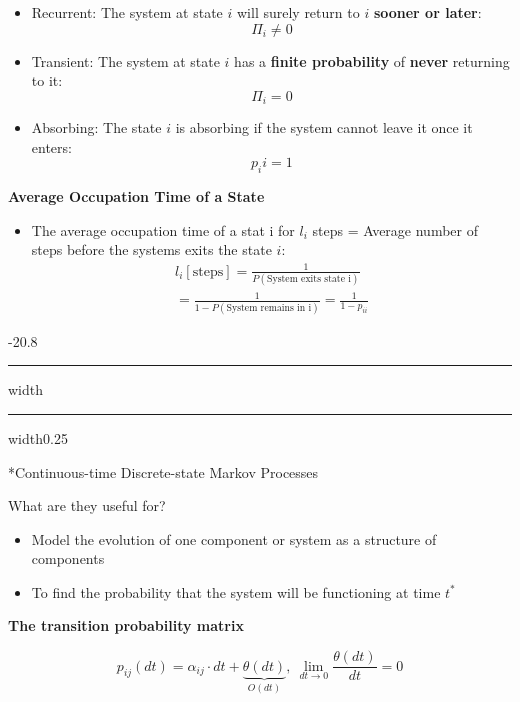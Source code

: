 \documentclass[8pt, landscape, fleqn]{scrartcl}
\makeatletter
\renewcommand{\subsection}{\@startsection{subsection}{1}{0mm}%
{-2\baselineskip}{0.8\baselineskip}%
{\hrule depth 0.2pt width\columnwidth\hrule depth0.75pt
width0.25\columnwidth\vspace*{1.2em}\large\bfseries\rmfamily}}
\makeatother
\begin{document}
\begin{multicols*}{3}
\begin{itemize}
    \item Recurrent: The system at state $i$ will surely return to $i$ \textbf{sooner or later}:
    \begin{equation}
        \Pi_i \neq 0
    \end{equation}
    \item Transient: The system at state $i$ has a \textbf{finite probability} of \textbf{never} returning to it:
    \begin{equation}
        \Pi_i = 0
    \end{equation}
    \item Absorbing: The state $i$ is absorbing if the system cannot leave it once it enters:
    \begin{equation}
        p_ii = 1
    \end{equation}
\end{itemize}

\newpage

\textbf{Average Occupation Time of a State}

\begin{itemize}
    \item The average occupation time of a stat i for $l_i$ steps = Average number of steps before the systems exits the state $i$:
    \begin{align}
        l_i [\text{steps}]= \frac{1}{P(\text{System exits state i})} \\ = \frac{1}{1-P(\text{System remains in i})} = \frac{1}{1-p_{ii}}
    \end{align}
\end{itemize}

\subsection*{Continuous-time Discrete-state Markov Processes}

What are they useful for?

\begin{itemize}
    \item Model the evolution of one component or system as a structure of components
    \item To find the probability that the system will be functioning at time $t^*$
\end{itemize}

\textbf{The transition probability matrix}

\begin{equation}
    p_{ij}(dt) = \alpha_{ij} \cdot dt + \underbrace{\theta(dt)}_{O(dt)},~\lim_{dt \rightarrow 0} \frac{\theta(dt)}{dt} = 0
\end{equation}


\end{multicols*}
\end{document}
